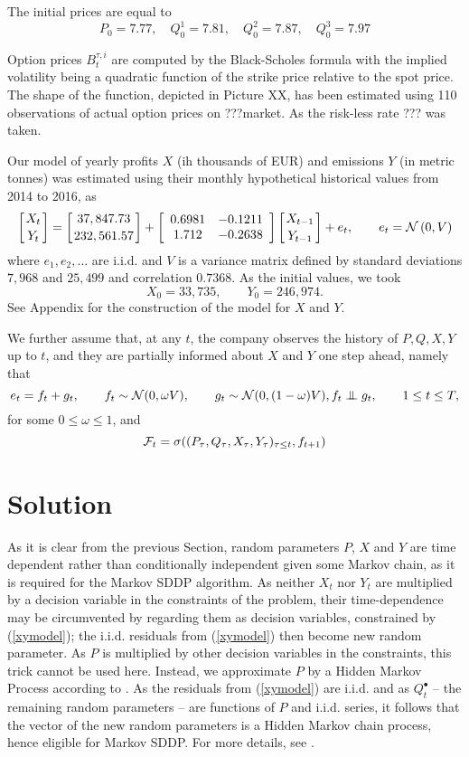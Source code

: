 \documentclass[3p,times]{elsarticle}
\begin{document}
The initial prices are equal to 
$$P_0=7.77, \quad Q^1_0=7.81,\quad Q^2_0=7.87,\quad Q^3_0=7.97$$ %

Option prices $B^{\tau,i}_t$ are computed by the Black-Scholes formula with the implied volatility being a quadratic function of the strike price relative to the spot price. The shape of the function, depicted in Picture XX, has been estimated using 110 observations of actual option prices on ???market. As the risk-less rate ??? was taken. 


Our model of yearly profits $X$ (ih thousands of EUR) and emissions $Y$ (in metric tonnes) was estimated using their monthly hypothetical historical values from 2014 to 2016, as 
\begin{equation}
\left[X_t
\atop
Y_t
\right]
=\left[37,847.73
\atop
232,561.57
\right]+
\left[
\begin{array}{cc}
0.6981 & -0.1211 \\
1.712 & -0.2638
\end{array}
\right]
\left[X_{t-1}
\atop
Y_{t-1}
\right]
 + e_t,\qquad e_t = \mathcal{N}\left(0,V\right)  
\end{equation}
where $e_1,e_2,\dots$ are i.i.d. and $V$ is a variance matrix defined by standard deviations $7,968$ and $25,499$ and correlation $0.7368$. As the initial values, we took
$$
X_0 = 33,735,\qquad Y_0 = 246,974.
$$
See Appendix for the construction of the model for $X$ and $Y$. 

We further assume that, at any $t$, the company observes the history of $P,Q,X,Y$ up to $t$, and they are  partially informed about $X$ and $Y$ one step ahead, namely that 
$$
e_t = f_t+g_t, \qquad f_t \sim \mathcal{N}(0,\omega V), 
\qquad
g_t \sim \mathcal{N}(0,(1-\omega) V),f_t \indep g_t,\qquad 1 \leq t \leq T,
$$
for some $0\leq \omega \leq 1$, and
$$
\mathcal{F}_t = \sigma( (P_\tau,Q_\tau,X_\tau,Y_\tau)_{\tau \leq t}, f_{t+1} )
$$
		
\section{Solution}

As it is clear from the previous Section, random parameters $P$, $X$ and $Y$ are time dependent rather than conditionally independent given some Markov chain, as it is required for the Markov SDDP algorithm. As neither $X_t$ nor  $Y_t$ are multiplied by a decision variable in the constraints of the problem, their time-dependence may be circumvented by regarding them as decision variables, constrained by (\ref{xymodel}); the i.i.d. residuals from (\ref{xymodel}) then become new random parameter. As $P$ is multiplied by other decision variables in the constraints, this trick cannot be used here. Instead, we approximate $P$ by a Hidden Markov Process according to  \citep{smid2019solution}. As the residuals from (\ref{xymodel}) are i.i.d. and as  $Q^\bullet_t$ -- the remaining random parameters -- are functions of $P$ and i.i.d. series, it follows that the vector of the new random parameters is a Hidden Markov chain process, hence eligible for Markov SDDP. For more details, see \citet{smid2019solution}.
\end{document}
